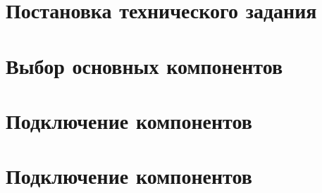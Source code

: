 \chapter{Постановка технического задания}



\chapter{Выбор основных компонентов}











\chapter{Подключение компонентов}











\chapter{Подключение компонентов}

